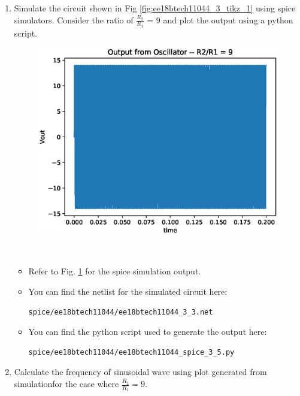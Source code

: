 \begin{enumerate}[label=\arabic*.,ref=\theenumi]
\item Simulate the circuit shown in Fig \ref{fig:ee18btech11044_3_tikz_1} using spice simulators. Consider the ratio of $\frac{R_2}{R_1}$ = 9 and plot the output using a python script.
\begin{figure}[!ht]
\centering
\includegraphics[width=\columnwidth]{./figs/ee18btech11044/ee18btech11044_3_12.eps}
\caption{}
\label{fig:ee18btech11044_3_12}
\end{figure}
\\
\solution 

\begin{itemize}
\item Refer to Fig. \ref{fig:ee18btech11044_3_12}
 for the spice simulation output.  
\item You can find the netlist for the simulated circuit here:
\begin{lstlisting}
spice/ee18btech11044/ee18btech11044_3_3.net
\end{lstlisting}
\item You can find the python script used to generate the output here:
\begin{lstlisting}
spice/ee18btech11044/ee18btech11044_spice_3_5.py
\end{lstlisting}
\end{itemize}



\item Calculate the frequency of sinusoidal wave using plot generated from simulationfor the case where $\frac{R_2}{R_1} = 9$.
 

\end{enumerate}
